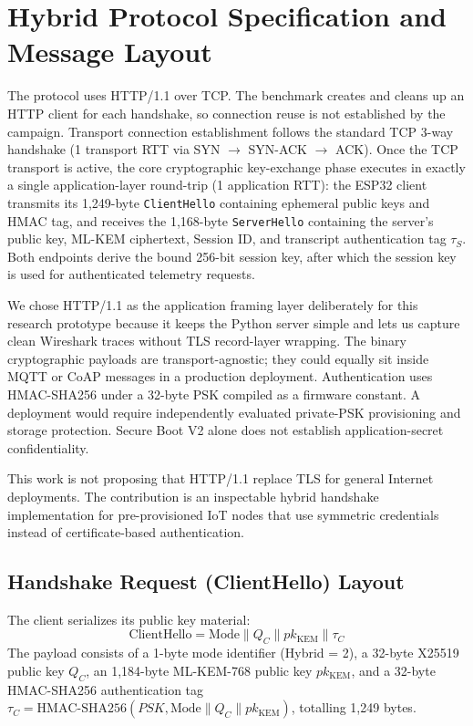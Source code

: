 \documentclass[journal, 10pt]{IEEEtran}
\begin{document}
\section{Hybrid Protocol Specification and Message Layout}
The protocol uses HTTP/1.1 over TCP. The benchmark creates and cleans up an HTTP client for each handshake, so connection reuse is not established by the campaign. Transport connection establishment follows the standard TCP 3-way handshake (1 transport RTT via SYN $\to$ SYN-ACK $\to$ ACK). Once the TCP transport is active, the core cryptographic key-exchange phase executes in exactly a single application-layer round-trip (1 application RTT): the ESP32 client transmits its 1,249-byte \texttt{ClientHello} containing ephemeral public keys and HMAC tag, and receives the 1,168-byte \texttt{ServerHello} containing the server's public key, ML-KEM ciphertext, Session ID, and transcript authentication tag $\tau_S$. Both endpoints derive the bound 256-bit session key, after which the session key is used for authenticated telemetry requests.

We chose HTTP/1.1 as the application framing layer deliberately for this research prototype because it keeps the Python server simple and lets us capture clean Wireshark traces without TLS record-layer wrapping. The binary cryptographic payloads are transport-agnostic; they could equally sit inside MQTT or CoAP messages in a production deployment. Authentication uses HMAC-SHA256 under a 32-byte PSK compiled as a firmware constant. A deployment would require independently evaluated private-PSK provisioning and storage protection. Secure Boot V2 alone does not establish application-secret confidentiality.

This work is not proposing that HTTP/1.1 replace TLS for general Internet deployments. The contribution is an inspectable hybrid handshake implementation for pre-provisioned IoT nodes that use symmetric credentials instead of certificate-based authentication.

\subsection{Handshake Request (ClientHello) Layout}
The client serializes its public key material:
\begin{equation}
\text{ClientHello} = \text{Mode} \parallel Q_C \parallel pk_{\text{KEM}} \parallel \tau_C
\end{equation}
The payload consists of a 1-byte mode identifier (Hybrid = 2), a 32-byte X25519 public key $Q_C$, an 1,184-byte ML-KEM-768 public key $pk_{\text{KEM}}$, and a 32-byte HMAC-SHA256 authentication tag $\tau_C = \text{HMAC-SHA256}(PSK, \text{Mode} \parallel Q_C \parallel pk_{\text{KEM}})$, totalling 1,249 bytes.
\end{document}
